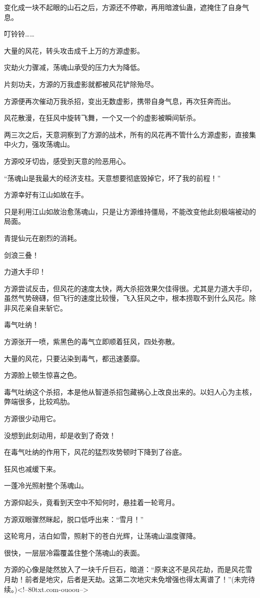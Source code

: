 \begin{this_body}
变化成一块不起眼的山石之后，方源还不停歇，再用暗渡仙蛊，遮掩住了自身气息。

叮铃铃……

大量的风花，转头攻击成千上万的方源虚影。

灾劫火力骤减，荡魂山承受的压力大为降低。

片刻功夫，方源的万我虚影就都被风花铲除殆尽。

方源便再次催动万我杀招，变出无数虚影，携带自身气息，再次狂奔而出。

风花散漫，在狂风中旋转飞舞，一个又一个的虚影被瞬间斩杀。

两三次之后，天意洞察到了方源的战术，所有的风花再不管什么方源虚影，直接集中火力，强攻荡魂山。

方源咬牙切齿，感受到天意的险恶用心。

“荡魂山是我最大的经济支柱。天意想要彻底毁掉它，坏了我的前程！”

方源幸好有江山如故在手。

只是利用江山如故治愈荡魂山，只是让方源维持僵局，不能改变他此刻极端被动的局面。

青提仙元在剧烈的消耗。

剑浪三叠！

力道大手印！

方源尝试反击，但风花的速度太快，两大杀招效果欠佳得很。尤其是力道大手印，虽然气势磅礴，但飞行的速度比较慢，飞入狂风之中，根本捞取不到什么风花。除非风花亲自来斩它。

毒气吐纳！

方源张开一喷，紫黑色的毒气立即顺着狂风，四处弥散。

大量的风花，只要沾染到毒气，都迅速萎靡。

方源脸上顿生惊喜之色。

毒气吐纳这个杀招，本是他从智道杀招包藏祸心上改良出来的。以妇人心为主核，弊端很多，比较鸡肋。

方源很少动用它。

没想到此刻动用，却是收到了奇效！

在毒气吐纳的作用下，风花的猛烈攻势顿时下降到了谷底。

狂风也减缓下来。

一蓬冷光照射整个荡魂山。

方源仰起头，竟看到天空中不知何时，悬挂着一轮弯月。

方源双眼骤然眯起，脱口低呼出来：“雪月！”

这轮弯月，洁白如雪，照射下的苍白光辉，让荡魂山温度骤降。

很快，一层层冷霜覆盖住整个荡魂山的表面。

方源的心像是陡然放入了一块千斤巨石，暗道：“原来这不是风花劫，而是风花雪月劫！前者是地灾，后者是天劫。这第二次地灾未免增强也得太离谱了！”(未完待续。)<!--80txt.com-ouoou-->

\end{this_body}

